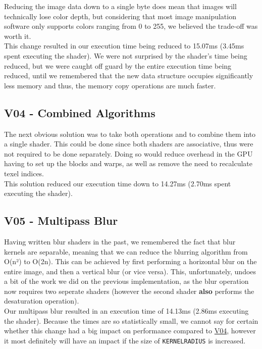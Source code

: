 \documentclass[10pt,journal,compsoc]{IEEEtran}
\def\code#1{\texttt{#1}}
\begin{document}
\noindent Reducing the image data down to a single byte does mean that images will technically lose color depth, but considering that most image manipulation software only supports colors ranging from 0 to 255, we believed the trade-off was worth it. \\

\noindent This change resulted in our execution time being reduced to 15.07ms (3.45ms spent executing the shader). We were not surprised by the shader's time being reduced, but we were caught off guard by the entire execution time being reduced, until we remembered that the new data structure occupies significantly less memory and thus, the memory copy operations are much faster. \\


\subsection{V04 - Combined Algorithms}
\label{sec:V04}

\noindent The next obvious solution was to take both operations and to combine them into a single shader. This could be done since both shaders are associative, thus were not required to be done separately. Doing so would reduce overhead in the GPU having to set up the blocks and warps, as well as remove the need to recalculate texel indices. \\

\noindent This solution reduced our execution time down to 14.27ms (2.70ms spent executing the shader).


\subsection{V05 - Multipass Blur}
\label{sec:V05}

\noindent Having written blur shaders in the past, we remembered the fact that blur kernels are separable\cite{multipassblur}, meaning that we can reduce the blurring algorithm from O(n²) to O(2n). This can be achieved by first performing a horizontal blur on the entire image, and then a vertical blur (or vice versa). This, unfortunately, undoes a bit of the work we did on the previous implementation, as the blur operation now requires two seperate shaders (however the second shader \textbf{also} performs the desaturation operation).\\

\noindent Our multipass blur resulted in an execution time of 14.13ms (2.86ms executing the shader). Because the times are so statistically small, we cannot say for certain whether this change had a big impact on performance compared to \hyperref[sec:V04]{V04}, however it most definitely will have an impact if the size of \code{KERNELRADIUS} is increased. \\
\end{document}
